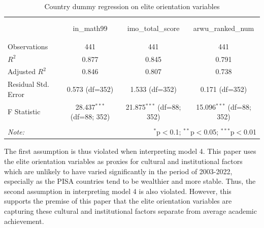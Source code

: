 \documentclass[11pt]{article}
\begin{document}
\begin{table}[!htbp] \centering
    \caption{Country dummy regression on elite orientation variables}
    \label{table:dummyreg}
    \resizebox{\linewidth}{!} {
    \begin{tabular}{@{\extracolsep{5pt}}lccc}
    \\[-1.8ex]\hline
    \hline \\[-1.8ex]
    \\[-1.8ex] & \multicolumn{1}{c}{in\_math99} & \multicolumn{1}{c}{imo\_total\_score} & \multicolumn{1}{c}{arwu\_ranked\_num}  \\
    \hline \\[-1.8ex]
    \hline \\[-1.8ex]
     Observations & 441 & 441 & 441 \\
     $R^2$ & 0.877 & 0.845 & 0.791 \\
     Adjusted $R^2$ & 0.846 & 0.807 & 0.738 \\
     Residual Std. Error & 0.573 (df=352) & 1.533 (df=352) & 0.171 (df=352) \\
     F Statistic & 28.437$^{***}$ (df=88; 352) & 21.875$^{***}$ (df=88; 352) & 15.096$^{***}$ (df=88; 352) \\
    \hline
    \hline \\[-1.8ex]
    \textit{Note:} & \multicolumn{3}{r}{$^{*}$p$<$0.1; $^{**}$p$<$0.05; $^{***}$p$<$0.01} \\
    \end{tabular}
    }
\end{table}
The first assumption is thus violated when interpreting model 4. This paper uses the elite orientation variables as proxies for cultural and institutional factors which are unlikely to have varied significantly in the period of 2003-2022, especially as the PISA countries tend to be wealthier and more stable. Thus, the second assumption in interpreting model 4 is also violated. However, this supports the premise of this paper that the elite orientation variables are capturing these cultural and institutional factors separate from average academic achievement.
\end{document}
